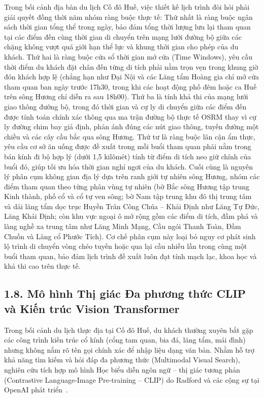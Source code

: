 Trong bối cảnh địa bàn du lịch Cố đô Huế, việc thiết kế lịch trình đòi hỏi phải giải quyết đồng thời năm nhóm ràng buộc thực tế:
Thứ nhất là ràng buộc ngân sách thời gian tổng thể trong ngày, bảo đảm tổng thời lượng lưu lại tham quan tại các điểm đến cùng thời gian di chuyển trên mạng lưới đường bộ giữa các chặng không vượt quá giới hạn thể lực và khung thời gian cho phép của du khách.
Thứ hai là ràng buộc cửa sổ thời gian mở cửa (Time Windows), yêu cầu thời điểm du khách đặt chân đến từng di tích phải nằm trọn vẹn trong khung giờ đón khách hợp lệ (chẳng hạn như Đại Nội và các Lăng tẩm Hoàng gia chỉ mở cửa tham quan ban ngày trước 17h30, trong khi các hoạt động phố đêm hoặc ca Huế trên sông Hương chỉ diễn ra sau 18h00).
Thứ ba là tính khả thi của mạng lưới giao thông đường bộ, trong đó thời gian và cự ly di chuyển giữa các điểm đến được tính toán chính xác thông qua ma trận đường bộ thực tế OSRM thay vì cự ly đường chim bay giả định, phản ánh đúng các nút giao thông, tuyến đường một chiều và các cây cầu bắc qua sông Hương.
Thứ tư là ràng buộc lân cận ẩm thực, yêu cầu cơ sở ăn uống được đề xuất trong mỗi buổi tham quan phải nằm trong bán kính đi bộ hợp lý (dưới 1,5 kilômét) tính từ điểm di tích neo giữ chính của buổi đó, giúp tối ưu hóa thời gian nghỉ ngơi của du khách.
Cuối cùng là nguyên lý phân cụm không gian địa lý dựa trên ranh giới tự nhiên sông Hương, nhóm các điểm tham quan theo từng phân vùng tự nhiên (bờ Bắc sông Hương tập trung Kinh thành, phố cổ và cổ tự ven sông; bờ Nam tập trung khu đô thị trung tâm và dải lăng tẩm dọc trục Huyền Trân Công Chúa -- Khải Định như Lăng Tự Đức, Lăng Khải Định; còn khu vực ngoại ô mở rộng gồm các điểm di tích, đầm phá và làng nghề xa trung tâm như Lăng Minh Mạng, Cầu ngói Thanh Toàn, Đầm Chuồn và Làng cổ Phước Tích). Cơ chế phân cụm này loại bỏ nguy cơ phát sinh lộ trình di chuyển vòng chéo tuyến hoặc qua lại cầu nhiều lần trong cùng một buổi tham quan, bảo đảm lịch trình đề xuất luôn đạt tính mạch lạc, khoa học và khả thi cao trên thực tế.

\subsection*{1.8. Mô hình Thị giác Đa phương thức CLIP và Kiến trúc Vision Transformer}
{}

Trong bối cảnh du lịch thực địa tại Cố đô Huế, du khách thường xuyên bắt gặp các công trình kiến trúc cổ kính (cổng tam quan, bia đá, lăng tẩm, mái đình) nhưng không nắm rõ tên gọi chính xác để nhập liệu dạng văn bản. Nhằm hỗ trợ khả năng tìm kiếm và hỏi đáp đa phương thức (Multimodal Visual Search), nghiên cứu tích hợp mô hình Học biểu diễn ngôn ngữ -- thị giác tương phản (Contrastive Language-Image Pre-training -- CLIP) do Radford và các cộng sự tại OpenAI phát triển~\cite{radford2021clip}.

